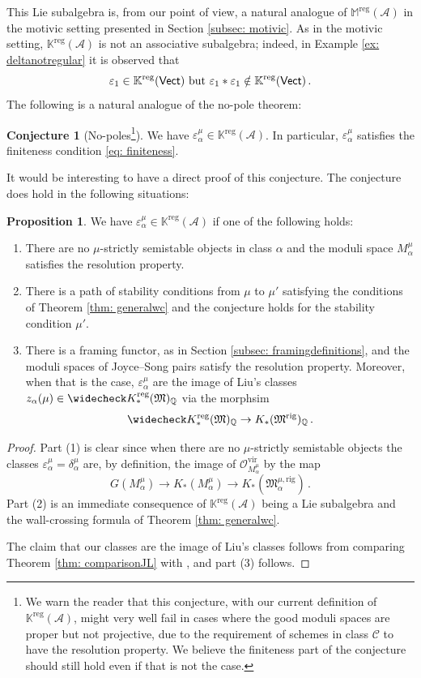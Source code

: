 \documentclass[12pt]{amsart}
\theoremstyle{definition}
\newtheorem{proposition}[definition]{Proposition}
\newtheorem{conjecture}[definition]{Conjecture}
\newcommand{\Vect}{\mathsf{Vect}}
\newcommand{\BK}{{\mathbb{K}}}
\newcommand{\BM}{{\mathbb{M}}}
\newcommand{\BQ}{{\mathbb{Q}}}
\newcommand{\CA}{{\mathcal A}}
\newcommand{\CO}{{\mathcal O}}
\newcommand{\1}{\mathbf 1}
\newcommand{\FM}{{\mathfrak{M}}}
\newcommand{\vir}{\mathrm{vir}}
\newcommand{\rig}{\mathrm{rig}}
\newcommand{\reg}{\mathrm{reg}}
\begin{document}
This Lie subalgebra is, from our point of view, a natural analogue of $\BM^\reg(\CA)$ in the motivic setting presented in Section \ref{subsec: motivic}. As in the motivic setting, $\BK^\reg(\CA)$ is not an associative subalgebra; indeed, in Example \ref{ex: deltanotregular} it is observed that 
\[\varepsilon_1\in \BK^\reg(\Vect)\textup{ but }\varepsilon_1\ast \varepsilon_1\notin  \BK^\reg(\Vect)\,.\]
The following is a natural analogue of the no-pole theorem:

\begin{conjecture}[No-poles\footnote{We warn the reader that this conjecture, with our current definition of $\BK^\reg(\CA)$, might very well fail in cases where the good moduli spaces are proper but not projective, due to the requirement of schemes in class $\mathcal C$ to have the resolution property. We believe the finiteness part of the conjecture should still hold even if that is not the case.}]\label{conj: nopole}
We have $\varepsilon_\alpha^\mu\in \BK^\reg(\CA)$. In particular, $\varepsilon_\alpha^\mu$ satisfies the finiteness condition \eqref{eq: finiteness}.
\end{conjecture}
It would be interesting to have a direct proof of this conjecture. The conjecture does hold in the following situations:
\begin{proposition}\label{prop: nopolesknown}
We have $\varepsilon_\alpha^\mu\in \BK^\reg(\CA)$ if one of the following holds:
\begin{enumerate}
    \item There are no $\mu$-strictly semistable objects in class $\alpha$ and the moduli space $M_\alpha^\mu$ satisfies the resolution property.
    \item There is a path of stability conditions from $\mu$ to $\mu'$ satisfying the conditions of Theorem \ref{thm: generalwc} and the conjecture holds for the stability condition $\mu'$.
    \item There is a framing functor, as in Section \ref{subsec: framingdefinitions}, and the moduli spaces of Joyce--Song pairs satisfy the resolution property. Moreover, when that is the case, $\varepsilon_\alpha^\mu$ are the image of Liu's classes $z_\alpha(\mu)\in \widecheck K_\ast^\reg(\FM)_\BQ$ via the morphsim \[\widecheck K_\ast^\reg(\FM)_\BQ\to K_\ast(\FM^\rig)_\BQ\,.\]
\end{enumerate}
\end{proposition}
\begin{proof}
Part (1) is clear since when there are no $\mu$-strictly semistable objects the classes $\varepsilon_\alpha^\mu=\delta_\alpha^\mu$ are, by definition, the image of $\CO_{M_\alpha^\mu}^\vir$ by the map
\[G(M_\alpha^\mu)\to K_\ast(M_\alpha^\mu)\to K_\ast(\FM_\alpha^{\mu, \rig})\,.\]
Part (2) is an immediate consequence of $\BK^\reg(\CA)$ being a Lie subalgebra and the wall-crossing formula of Theorem \ref{thm: generalwc}. 

The claim that our classes are the image of Liu's classes follows from comparing Theorem \ref{thm: comparisonJL} with \cite[Theorem 4.2.5]{Liu}, and part (3) follows.
\end{proof}
\end{document}
